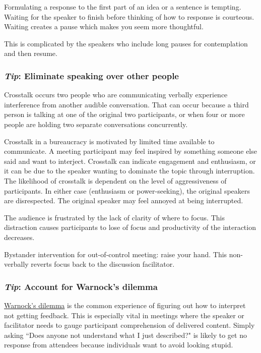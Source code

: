 Formulating a response to the first part of an idea or a sentence is tempting. Waiting for the speaker to finish before thinking of how to response is courteous. Waiting creates a pause which makes you seem more thoughtful. 

This is complicated by the speakers who include long pauses for contemplation and then resume. 

\subsubsection*{\textit{Tip}: Eliminate speaking over other people\label{sec:crosstalk}}

Crosstalk occurs two people who are communicating verbally experience interference from another audible conversation. That can occur because a third person is talking at one of the original two participants, or when four or more people are holding two separate conversations concurrently. 

Crosstalk in a bureaucracy is motivated by
limited time available to communicate. A meeting participant may feel inspired by something someone else said and want to interject. 
Crosstalk can indicate engagement and enthusiasm, or it can be due to the speaker wanting to dominate the topic through interruption. The likelihood of crosstalk is dependent on the level of aggressiveness of participants.
In either case (enthusiasm or power-seeking), the original speakers are disrespected. The original speaker may feel annoyed at being interrupted.



The audience is frustrated by the lack of clarity of where to focus. This distraction causes participants to lose of focus and productivity of the interaction decreases.

Bystander intervention for out-of-control meeting: raise your hand.  This non-verbally reverts focus back to the discussion facilitator. 

\subsubsection*{\textit{Tip}: Account for Warnock's dilemma}
\href{https://en.wikipedia.org/wiki/Warnock\%27s_dilemma}{Warnock's dilemma}
is the common experience of figuring out how to interpret not getting feedback. This is especially vital in meetings where the speaker or facilitator needs to gauge participant comprehension of delivered content. Simply asking ``Does anyone not understand what I just described?" is likely to get no response from attendees because individuals want to avoid looking stupid.

